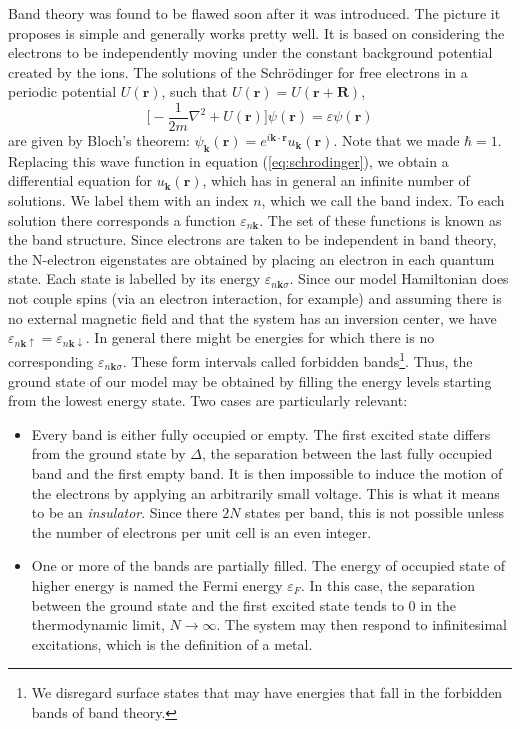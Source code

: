 Band theory was found to be flawed soon after it was introduced.
The picture it proposes is simple and generally works pretty well.
It is based on considering the electrons to be independently moving under the constant background potential created by the ions.
The solutions of the Schr\"odinger for free electrons in a periodic potential $U(\bm r)$, such that $U(\bm r) = U(\bm r + \bm R)$,
\begin{equation}\label{eq:schrodinger}
\bigg[ -\frac{1}{2m} \nabla^2 + U(\bm r) \bigg] \psi (\bm r) = \varepsilon \psi (\bm r)
\end{equation}
are given by Bloch's theorem: $\psi_{\bm k} (\bm r) = e^{i\bm k \cdot \bm r} u_{\bm k} (\bm r)$.
Note that we made $\hbar = 1$.
Replacing this wave function in equation (\ref{eq:schrodinger}), we obtain a differential equation for $u_{\bm k} (\bm r)$, which has in general an infinite number of solutions.
We label them with an index $n$, which we call the band index.
To each solution there corresponds a function $\varepsilon_{n\bm k}$.
The set of these functions is known as the band structure.
Since electrons are taken to be independent in band theory, the N-electron eigenstates are obtained by placing an electron in each quantum state.
Each state is labelled by its energy $\varepsilon_{n\bm k \sigma}$.
Since our model Hamiltonian does not couple spins (via an electron interaction, for example) and assuming there is no external magnetic field and that the system has an inversion center, we have $\varepsilon_{n\bm k \uparrow} = \varepsilon_{n\bm k \downarrow}$.
In general there might be energies for which there is no corresponding $\varepsilon_{n\bm k \sigma}$.
These form intervals called forbidden bands\footnote{We disregard surface states that may have energies that fall in the forbidden bands of band theory.}.
Thus, the ground state of our model may be obtained by filling the energy levels starting from the lowest energy state.
Two cases are particularly relevant:
\begin{itemize}
\item Every band is either fully occupied or empty.
The first excited state differs from the ground state by $\Delta$, the separation between the last fully occupied band and the first empty band.
It is then impossible to induce the motion of the electrons by applying an arbitrarily small voltage.
This is what it means to be an \emph{insulator}.
Since there $2N$ states per band, this is not possible unless the number of electrons per unit cell is an even integer.
\item One or more of the bands are partially filled.
The energy of occupied state of higher energy is named the Fermi energy $\varepsilon_F$.
In this case, the separation between the ground state and the first excited state tends to $0$ in the thermodynamic limit, $N \rightarrow \infty$.
The system may then respond to infinitesimal excitations, which is the definition of a metal.
\end{itemize}

